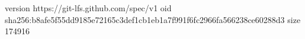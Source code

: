 version https://git-lfs.github.com/spec/v1
oid sha256:b8afe5f55dd9185e72165c3def1cb1eb1a7f991f6fc2966fa566238ce60288d3
size 174916
